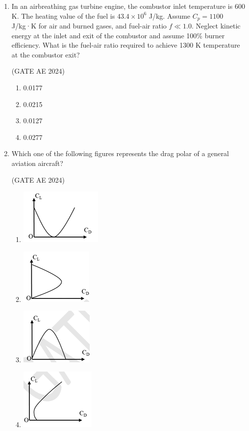 \documentclass[journal,12pt,onecolumn]{IEEEtran}
\theoremstyle{remark}
\begin{document}
\begin{flushleft}
\begin{enumerate}
\item In an airbreathing gas turbine engine, the combustor inlet temperature is 600 K. The heating value of the fuel is $43.4 \times 10^6$ J/kg. Assume $C_p = 1100$ J/kg·K for air and burned gases, and fuel-air ratio $f \ll 1.0$. Neglect kinetic energy at the inlet and exit of the combustor and assume 100\% burner efficiency. What is the fuel-air ratio required to achieve 1300 K temperature at the combustor exit?

\hfill (GATE AE 2024)

\begin{enumerate}
    \item 0.0177
    \item 0.0215
    \item 0.0127
    \item 0.0277
\end{enumerate}

\item Which one of the following figures represents the drag polar of a general aviation aircraft? 

\hfill (GATE AE 2024)

\begin{enumerate}
    \item \includegraphics[width=0.2\columnwidth]{figs/A.png}
    \item \includegraphics[width=0.2\columnwidth]{figs/B.png}
    \item \includegraphics[width=0.2\columnwidth]{figs/C.png}
    \item \includegraphics[width=0.2\columnwidth]{figs/D.png}
\end{enumerate}


\end{enumerate}
\end{flushleft}
\end{document}
